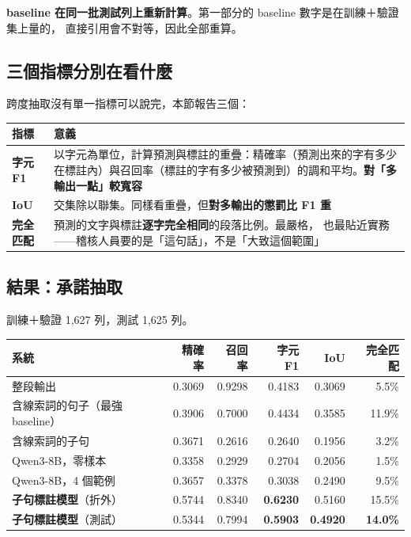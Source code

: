 \documentclass[11pt,a4paper]{ctexart}
\begin{document}
\textbf{baseline 在同一批測試列上重新計算}。第一部分的 baseline 數字是在訓練＋驗證集上量的，
直接引用會不對等，因此全部重算。

\subsection{三個指標分別在看什麼}

跨度抽取沒有單一指標可以說完，本節報告三個：

\begin{table}[h]
\centering\small
\begin{tabular}{@{}p{3cm}p{11.5cm}@{}}
\toprule
指標 & 意義 \\
\midrule
\textbf{字元 F1} & 以字元為單位，計算預測與標註的重疊：精確率（預測出來的字有多少
在標註內）與召回率（標註的字有多少被預測到）的調和平均。\textbf{對「多輸出一點」較寬容} \\
\addlinespace
\textbf{IoU} & 交集除以聯集。同樣看重疊，但\textbf{對多輸出的懲罰比 F1 重} \\
\addlinespace
\textbf{完全匹配} & 預測的文字與標註\textbf{逐字完全相同}的段落比例。最嚴格，
也最貼近實務——稽核人員要的是「這句話」，不是「大致這個範圍」 \\
\bottomrule
\end{tabular}
\end{table}

\subsection{結果：承諾抽取}

訓練＋驗證 1{,}627 列，測試 1{,}625 列。

\begin{table}[h]
\centering\small
\begin{tabular}{@{}lrrrrr@{}}
\toprule
系統 & 精確率 & 召回率 & 字元 F1 & IoU & 完全匹配 \\
\midrule
整段輸出 & 0.3069 & 0.9298 & 0.4183 & 0.3069 & 5.5\% \\
含線索詞的句子（最強 baseline） & 0.3906 & 0.7000 & 0.4434 & 0.3585 & 11.9\% \\
含線索詞的子句 & 0.3671 & 0.2616 & 0.2640 & 0.1956 & 3.2\% \\
\midrule
Qwen3-8B，零樣本 & 0.3358 & 0.2929 & 0.2704 & 0.2056 & 1.5\% \\
Qwen3-8B，4 個範例 & 0.3657 & 0.3378 & 0.3038 & 0.2490 & 9.5\% \\
\midrule
\rowcolor{green!12}
\textbf{子句標註模型}（折外） & 0.5744 & 0.8340 & \textbf{0.6230} & 0.5160 & 15.5\% \\
\rowcolor{green!12}
\textbf{子句標註模型}（測試） & 0.5344 & 0.7994 & \textbf{0.5903} & \textbf{0.4920} & \textbf{14.0\%} \\
\bottomrule
\end{tabular}
\end{table}
\end{document}
